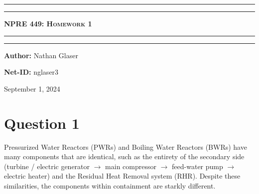 \documentclass{article}
\begin{document}
\begin{titlepage}

\centering
\scshape
\vspace{\baselineskip}

%
\rule{\textwidth}{1.6pt}\vspace*{-\baselineskip}\vspace*{2pt}
\rule{\textwidth}{0.4pt}

{\Huge \textbf{\textsc{NPRE 449: Homework 1 \\
\vspace{15pt}}}}

\rule{\textwidth}{0.4pt}\vspace*{-\baselineskip}\vspace{3.2pt}
\rule{\textwidth}{1.6pt}\vspace{6pt}
\vspace{1.5\baselineskip}


\large \centerline{\textbf{Author:} Nathan Glaser}
\large \centerline{\textbf{Net-ID:} nglaser3}
\quad

\vfill
\large \centerline{September 1, 2024}
%
\end{titlepage}

\tableofcontents
\newpage
{}


\section*{Question 1}

Pressurized Water Reactors (PWRs) and Boiling Water Reactors (BWRs) have many components that are identical, such as the entirety of the secondary side (turbine / electric generator  $\rightarrow$ main compressor $\rightarrow$ feed-water pump $\rightarrow$ electric heater) and the Residual Heat Removal system (RHR). Despite these similarities, the components within containment are starkly different. 
\end{document}
